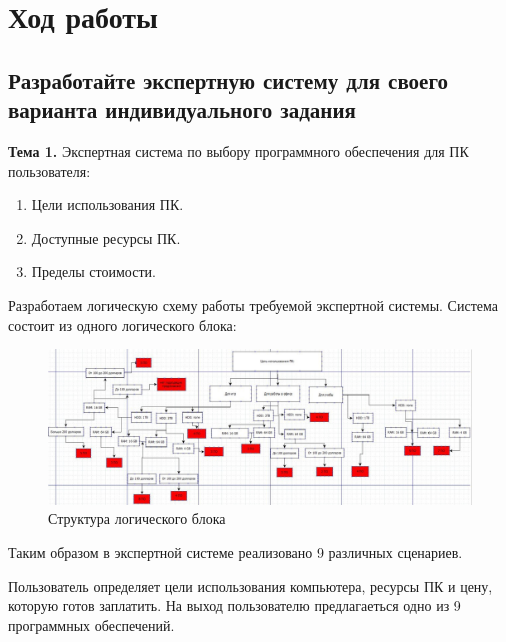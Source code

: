 \documentclass[14pt,a4paper,report]{report}
\begin{document}
\clearpage

\section{Ход работы}

\subsection{Разработайте экспертную систему для своего варианта индивидуального задания}

\textbf{Тема 1.} Экспертная система по выбору программного обеспечения для ПК пользователя:

\begin{enumerate}
	\item Цели использования ПК.
	\item Доступные ресурсы ПК.
	\item Пределы стоимости.
\end{enumerate}

Разработаем логическую схему работы требуемой экспертной системы. Система состоит из одного логического блока:

\begin{figure}[h!]
	\centering
	\includegraphics[scale = 0.55]{images/diag.jpg}
	\caption{Структура логического блока}
\end{figure}


Таким образом в экспертной системе реализовано 9 различных сценариев.

Пользователь определяет цели использования компьютера, ресурсы ПК и цену, которую готов заплатить. На выход пользователю предлагаеться одно из 9 программных обеспечений.
\end{document}
